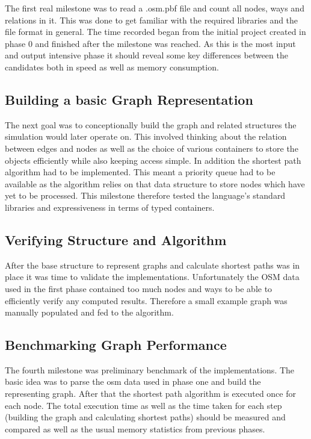 The first real milestone was to read a .osm.pbf file and count all nodes, ways and relations in it. This was done to get familiar with the required libraries and the file format in general. The time recorded began from the initial project created in phase 0 and finished after the milestone was reached. As this is the most input and output intensive phase it should reveal some key differences between the candidates both in speed as well as memory consumption.

\subsection*{Building a basic Graph Representation}
\label{subsec:Concept::Implementation::Graph_Representation}

The next goal was to conceptionally build the graph and related structures the simulation would later operate on. This involved thinking about the relation between edges and nodes as well as the choice of various containers to store the objects efficiently while also keeping access simple. In addition the shortest path algorithm had to be implemented. This meant a priority queue had to be available as the algorithm relies on that data structure to store nodes which have yet to be processed. This milestone therefore tested the language's standard libraries and expressiveness in terms of typed containers.

\subsection*{Verifying Structure and Algorithm}
\label{subsec:Concept::Implementation::Verification}

After the base structure to represent graphs and calculate shortest paths was in place it was time to validate the implementations. Unfortunately the OSM data used in the first phase contained too much nodes and ways to be able to efficiently verify any computed results. Therefore a small example graph was manually populated and fed to the algorithm.

\subsection*{Benchmarking Graph Performance}
\label{subsec:Concept::Implementation::SequentialBenchmark}

The fourth milestone was preliminary benchmark of the implementations. The basic idea was to parse the \gls{osm} data used in phase one and build the representing graph. After that the shortest path algorithm is executed once for each node. The total execution time as well as the time taken for each step (building the graph and calculating shortest paths) should be measured and compared as well as the usual memory statistics from previous phases.

